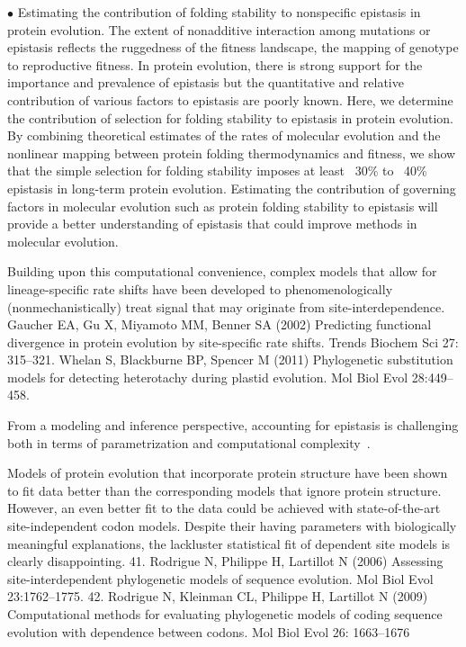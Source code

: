 $\bullet$ Estimating the contribution of folding stability to nonspecific epistasis in protein evolution.
The extent of nonadditive interaction among mutations or epistasis reflects the ruggedness of the fitness landscape, the mapping of genotype to reproductive fitness.
In protein evolution, there is strong support for the importance and prevalence of epistasis but the quantitative and relative contribution of various factors to epistasis are poorly known.
Here, we determine the contribution of selection for folding stability to epistasis in protein evolution.
By combining theoretical estimates of the rates of molecular evolution and the nonlinear mapping between protein folding thermodynamics and fitness, we show that the simple selection for folding stability imposes at least ~30\% to ~40\% epistasis in long-term protein evolution.
Estimating the contribution of governing factors in molecular evolution such as protein folding stability to epistasis will provide a better understanding of epistasis that could improve methods in molecular evolution.
\citet{Dasmeh2018}

Building upon this computational convenience, complex models that allow for lineage-specific rate shifts have been developed to phenomenologically (nonmechanistically) treat signal that may originate from site-interdependence.
Gaucher EA, Gu X, Miyamoto MM, Benner SA (2002) Predicting functional divergence in protein evolution by site-specific rate shifts. Trends Biochem Sci 27: 315–321.
Whelan S, Blackburne BP, Spencer M (2011) Phylogenetic \gls{substitution} models for detecting heterotachy during plastid evolution. Mol Biol Evol 28:449–458.

From a modeling and inference perspective, accounting for epistasis is challenging both in terms of parametrization and computational complexity~\citep{Rodrigue2005, Manhart2014}.

Models of protein evolution that incorporate protein structure have been shown to fit data better than the corresponding models that ignore protein structure.
However, an even better fit to the data could be achieved with state-of-the-art site-independent \gls{codon} models.
Despite their having parameters with biologically meaningful explanations, the lackluster statistical fit of dependent site models is clearly disappointing.
41. Rodrigue N, Philippe H, Lartillot N (2006) Assessing site-interdependent phylogenetic models of sequence evolution. Mol Biol Evol 23:1762–1775.
42. Rodrigue N, Kleinman CL, Philippe H, Lartillot N (2009) Computational methods for evaluating phylogenetic models of coding sequence evolution with dependence between \glspl{codon}. Mol Biol Evol 26: 1663–1676

